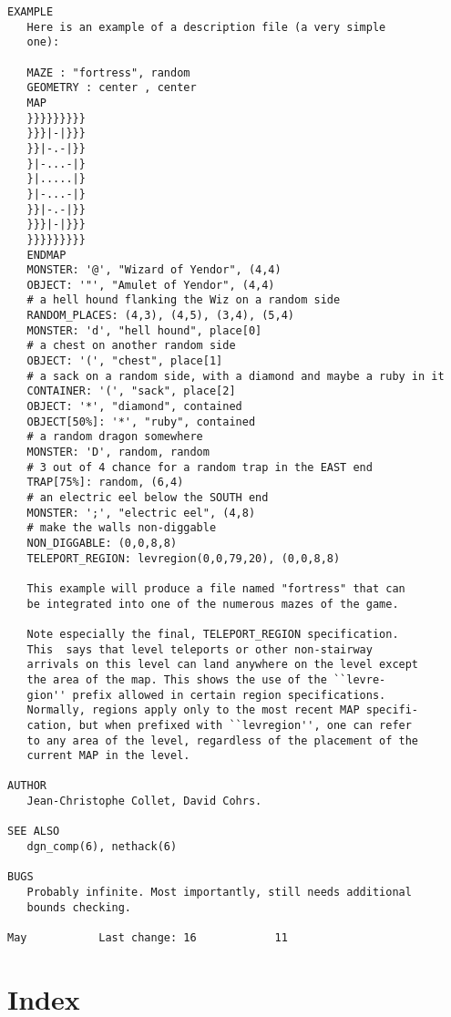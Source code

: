 \documentclass[11pt]{article}
\begin{document}
\begin{verbatim}
EXAMPLE
   Here is an example of a description file (a very simple
   one):

   MAZE : "fortress", random
   GEOMETRY : center , center
   MAP
   }}}}}}}}}
   }}}|-|}}}
   }}|-.-|}}
   }|-...-|}
   }|.....|}
   }|-...-|}
   }}|-.-|}}
   }}}|-|}}}
   }}}}}}}}}
   ENDMAP
   MONSTER: '@', "Wizard of Yendor", (4,4)
   OBJECT: '"', "Amulet of Yendor", (4,4)
   # a hell hound flanking the Wiz on a random side
   RANDOM_PLACES: (4,3), (4,5), (3,4), (5,4)
   MONSTER: 'd', "hell hound", place[0]
   # a chest on another random side
   OBJECT: '(', "chest", place[1]
   # a sack on a random side, with a diamond and maybe a ruby in it
   CONTAINER: '(', "sack", place[2]
   OBJECT: '*', "diamond", contained
   OBJECT[50%]: '*', "ruby", contained
   # a random dragon somewhere
   MONSTER: 'D', random, random
   # 3 out of 4 chance for a random trap in the EAST end
   TRAP[75%]: random, (6,4)
   # an electric eel below the SOUTH end
   MONSTER: ';', "electric eel", (4,8)
   # make the walls non-diggable
   NON_DIGGABLE: (0,0,8,8)
   TELEPORT_REGION: levregion(0,0,79,20), (0,0,8,8)

   This example will produce a file named "fortress" that can
   be integrated into one of the numerous mazes of the game.

   Note especially the final, TELEPORT_REGION specification.
   This  says that level teleports or other non-stairway
   arrivals on this level can land anywhere on the level except
   the area of the map. This shows the use of the ``levre-
   gion'' prefix allowed in certain region specifications.
   Normally, regions apply only to the most recent MAP specifi-
   cation, but when prefixed with ``levregion'', one can refer
   to any area of the level, regardless of the placement of the
   current MAP in the level.

AUTHOR
   Jean-Christophe Collet, David Cohrs.

SEE ALSO
   dgn_comp(6), nethack(6)

BUGS
   Probably infinite. Most importantly, still needs additional
   bounds checking.

May           Last change: 16            11

\end{verbatim}

\section{Index}
\label{sec:org8b52945}
\end{document}
